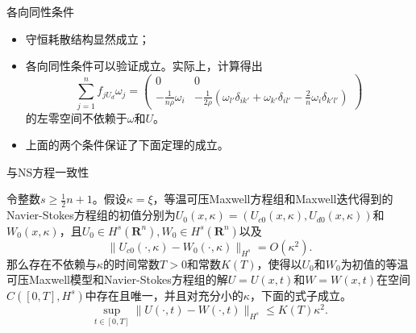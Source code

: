 \documentclass[mathserif]{beamer}
\begin{document}
\begin{frame}{各向同性条件}
\begin{itemize}
\item<2-> 守恒耗散结构显然成立；
\item<3-> 各向同性条件可以验证成立。实际上，计算得出
\begin{equation*}
			\sum_{j=1}^n f_{jU_d} \omega_j = \left( \begin{matrix}
				0 & 0 \\
				-\frac{1}{n \rho} \omega_i & -\frac{1}{2 \rho} (\omega_{l'} \delta_{ik'} + \omega_{k'} \delta_{il'} - \frac{2}{n} \omega_i \delta_{k'l'})
			\end{matrix}
			\right)
		\end{equation*}
		的左零空间不依赖于$\omega$和$U$。
\item<4-> 上面的两个条件保证了下面定理的成立。
\end{itemize}
\end{frame}

\begin{frame}{与NS方程一致性}
\begin{theorem} %
		令整数$s \ge \frac{1}{2}n+1$。假设$\kappa=\xi$，等温可压Maxwell方程组和Maxwell迭代得到的Navier-Stokes方程组的初值分别为$U_0(x,\kappa) = (U_{c0}(x,\kappa),U_{d0}(x,\kappa))$和$W_0(x,\kappa)$，且$U_0 \in H^s(\mathbf{R}^n), W_0 \in H^s(\mathbf{R}^n)$以及
		\begin{equation*}
			\|U_{c0}(\cdot,\kappa) - W_0(\cdot, \kappa) \|_{H^s} = O(\kappa^2).
		\end{equation*}
		那么存在不依赖与$\kappa$的时间常数$T>0$和常数$K(T)$，使得以$U_0$和$W_0$为初值的等温可压Maxwell模型和Navier-Stokes方程组的解$U=U(x,t)$和$W=W(x,t)$在空间$C([0,T],H^s)$中存在且唯一，并且对充分小的$\kappa$，下面的式子成立。
		\begin{equation*}
			\sup_{t \in [0,T]} \| U(\cdot,t) - W(\cdot,t) \|_{H^s} \le K(T) \kappa^2.
		\end{equation*}
	\end{theorem}
\end{frame}

\end{document}
